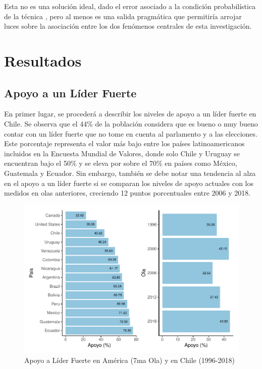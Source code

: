 \documentclass[12pt,oneside]{templates/facsothesis}
\begin{document}
Esta no es una solución ideal, dado el error asociado a la condición probabilística de la técnica \citep{collins2010}, pero al menos es una salida pragmática que permitiría arrojar luces sobre la asociación entre los dos fenómenos centrales de esta investigación.

\hypertarget{resultados}{%
\chapter*{Resultados}\label{resultados}}

\hypertarget{apoyo-a-un-luxedder-fuerte-1}{%
\section*{Apoyo a un Líder Fuerte}\label{apoyo-a-un-luxedder-fuerte-1}}

En primer lugar, se procederá a describir los niveles de apoyo a un líder fuerte en Chile. Se observa que el 44\% de la población considera que es bueno o muy bueno contar con un líder fuerte que no tome en cuenta al parlamento y a las elecciones. Este porcentaje representa el valor más bajo entre los países latinoamericanos incluidos en la Encuesta Mundial de Valores, donde solo Chile y Uruguay se encuentran bajo el 50\% y se eleva por sobre el 70\% en países como México, Guatemala y Ecuador. Sin embargo, también se debe notar una tendencia al alza en el apoyo a un líder fuerte si se comparan los niveles de apoyo actuales con los medidos en olas anteriores, creciendo 12 puntos porcentuales entre 2006 y 2018.

\begin{figure}[H]
\includegraphics[width=1\linewidth,]{tesis_files/figure-latex/unnamed-chunk-6-1} \caption{Apoyo a Líder Fuerte en América (7ma Ola) y en Chile (1996-2018)}\label{fig:unnamed-chunk-6}
\end{figure}
\end{document}
